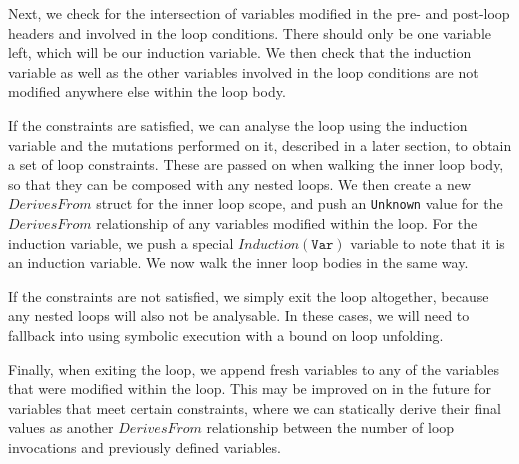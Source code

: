 Next, we check for the intersection of variables modified in the pre- and post-loop headers and involved in
the loop conditions. There should only be one variable left, which will be our induction variable. We then check
that the induction variable as well as the other variables involved in the loop conditions are not modified anywhere 
else within the loop body.

If the constraints are satisfied, we can analyse the loop using the induction variable and the mutations performed on it,
described in a later section, to obtain a set of loop constraints. These are passed on when walking the inner loop body,
so that they can be composed with any nested loops. We then create a new $DerivesFrom$ struct for the inner loop scope, 
and push an \texttt{Unknown} value for the $DerivesFrom$ relationship of any variables modified within the loop. For the 
induction variable, we push a special $Induction(\texttt{Var})$ variable to note that it is an induction variable. We now walk
the inner loop bodies in the same way.

If the constraints are not satisfied, we simply exit the loop altogether, because any nested loops will also not be analysable.
In these cases, we will need to fallback into using symbolic execution with a bound on loop unfolding.

Finally, when exiting the loop, we append fresh variables to any of the variables that were modified within the loop. This
may be improved on in the future for variables that meet certain constraints, where we can statically derive their final 
values as another $DerivesFrom$ relationship between the number of loop invocations and previously defined variables.

